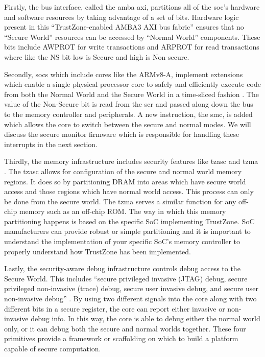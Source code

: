 Firstly, the bus interface, called the \gls{amba} \gls{axi}, partitions all of the \gls{soc}’s hardware and software resources by taking advantage of a set of bits. Hardware logic present in this ``TrustZone-enabled AMBA3 AXI  bus fabric'' \cite{ArmBuildingSS} ensures that no ``Secure World'' resources can be accessed by ``Normal World'' components. These bits include AWPROT for write transactions and ARPROT for read transactions where like the NS bit low is Secure and high is Non-secure. 

Secondly, \gls{soc}s which include cores like the ARMv8-A, implement extensions which enable a single physical processor core to safely and efficiently execute code from both the Normal World and the Secure World in a time-sliced fashion \cite{TrustZoneExplained}. The value of the Non-Secure bit is read from the \gls{scr} and passed along down the bus to the memory controller and peripherals. A new instruction, the \gls{smc}, is added which allows the core to switch between the secure and normal modes. We will discuss the secure monitor firmware which is responsible for handling these interrupts in the next section.

Thirdly, the memory infrastructure includes security features like \gls{tzasc} and \gls{tzma} \cite{TrustZoneExplained}. The \gls{tzasc} allows for configuration of the secure and normal world memory regions. It does so by partitioning DRAM into areas which have secure world access and those regions which have normal world access. This process can only be done from the secure world. The \gls{tzma} serves a similar function for any off-chip memory such as an off-chip ROM. The way in which this memory partitioning happens is based on the specific SoC implementing TrustZone. SoC manufacturers can provide robust or simple partitioning and it is important to understand the implementation of your specific SoC's memory controller to properly understand how TrustZone has been implemented.

Lastly, the security-aware debug infrastructure controls debug access to the Secure World. This includes ``secure privileged invasive (JTAG) debug, secure privileged non-invasive (trace) debug, secure user invasive debug, and secure user non-invasive debug'' \cite{ArmBuildingSS}. By using two different signals into the core along with two different bits in a secure register, the core can report either invasive or non-invasive debug info. In this way, the core is able to debug either the normal world only, or it can debug both the secure and normal worlds together. These four primitives provide a framework or scaffolding on which to build a platform capable of secure computation.

